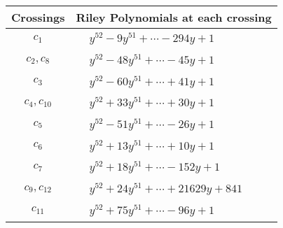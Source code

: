 \documentclass[1p]{elsarticle_modified}
\theoremstyle{definition}
\begin{document}
\begin{tabular}{m{50pt}|m{274pt}}
Crossings & \hspace{64pt}Riley Polynomials at each crossing \\
\hline $$\begin{aligned}c_{1}\end{aligned}$$&$\begin{aligned}
&y^{52}-9 y^{51}+\cdots-294 y+1
\end{aligned}$\\
\hline $$\begin{aligned}c_{2},c_{8}\end{aligned}$$&$\begin{aligned}
&y^{52}-48 y^{51}+\cdots-45 y+1
\end{aligned}$\\
\hline $$\begin{aligned}c_{3}\end{aligned}$$&$\begin{aligned}
&y^{52}-60 y^{51}+\cdots+41 y+1
\end{aligned}$\\
\hline $$\begin{aligned}c_{4},c_{10}\end{aligned}$$&$\begin{aligned}
&y^{52}+33 y^{51}+\cdots+30 y+1
\end{aligned}$\\
\hline $$\begin{aligned}c_{5}\end{aligned}$$&$\begin{aligned}
&y^{52}-51 y^{51}+\cdots-26 y+1
\end{aligned}$\\
\hline $$\begin{aligned}c_{6}\end{aligned}$$&$\begin{aligned}
&y^{52}+13 y^{51}+\cdots+10 y+1
\end{aligned}$\\
\hline $$\begin{aligned}c_{7}\end{aligned}$$&$\begin{aligned}
&y^{52}+18 y^{51}+\cdots-152 y+1
\end{aligned}$\\
\hline $$\begin{aligned}c_{9},c_{12}\end{aligned}$$&$\begin{aligned}
&y^{52}+24 y^{51}+\cdots+21629 y+841
\end{aligned}$\\
\hline $$\begin{aligned}c_{11}\end{aligned}$$&$\begin{aligned}
&y^{52}+75 y^{51}+\cdots-96 y+1
\end{aligned}$\\
\hline
\end{tabular}\\~\\
\end{document}
